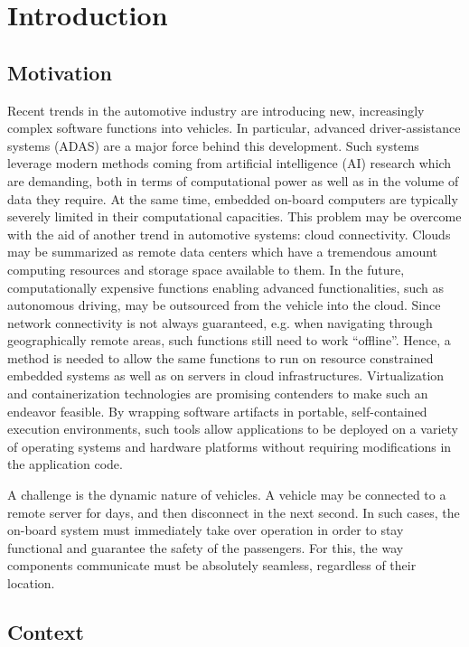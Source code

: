 
\chapter{Introduction}\label{chapter:introduction}


\section{Motivation}
Recent trends in the automotive industry are introducing new, increasingly complex software functions into vehicles. In particular, advanced driver-assistance systems (ADAS) are a major force behind this development. Such systems leverage modern methods coming from artificial intelligence (AI) research which are demanding, both in terms of computational power as well as in the volume of data they require. At the same time, embedded on-board computers are typically severely limited in their computational capacities. This problem may be overcome with the aid of another trend in automotive systems: cloud connectivity. Clouds may be summarized as remote data centers which have a tremendous amount computing resources and storage space available to them. In the future, computationally expensive functions enabling advanced functionalities, such as autonomous driving, may be outsourced from the vehicle into the cloud. Since network connectivity is not always guaranteed, e.g. when navigating through geographically remote areas, such functions still need to work ``offline''. Hence, a method is needed to allow the same functions to run on resource constrained embedded systems as well as on servers in cloud infrastructures. Virtualization and containerization technologies are promising contenders to make such an endeavor feasible. By wrapping software artifacts in portable, self-contained execution environments, such tools allow applications to be deployed on a variety of operating systems and hardware platforms without requiring modifications in the application code. 

A challenge is the dynamic nature of vehicles. A vehicle may be connected to a remote server for days, and then disconnect in the next second. In such cases, the on-board system must immediately take over operation in order to stay functional and guarantee the safety of the passengers. For this, the way components communicate must be absolutely seamless, regardless of their location.

%
%
%
%
%
%
%
%
%
%

\section{Context}

